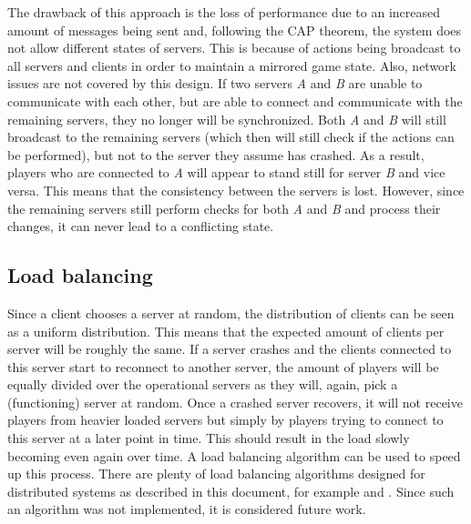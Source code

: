 		The drawback of this approach is the loss of performance due to an increased amount of messages being sent and, following the CAP theorem, the system does not allow different states of servers. 
		This is because of actions being broadcast to all servers and clients in order to maintain a mirrored game state. 
		Also, network issues are not covered by this design. 
		If two servers \emph{A} and \emph{B} are unable to communicate with each other, but are able to connect and communicate with the remaining servers, they no longer will be synchronized. 
		Both \emph{A} and \emph{B} will still broadcast to the remaining servers (which then will still check if the actions can be performed), but not to the server they assume has crashed. 
		As a result, players who are connected to \emph{A} will appear to stand still for server \emph{B} and vice versa. 
		This means that the consistency between the servers is lost. 
		However, since the remaining servers still perform checks for both \emph{A} and \emph{B} and process their changes, it can never lead to a conflicting state.
	
	\subsection{Load balancing}
	\label{subsec:load_balancing}
		Since a client chooses a server at random, the distribution of clients can be seen as a uniform distribution. 
		This means that the expected amount of clients per server will be roughly the same.
		If a server crashes and the clients connected to this server start to reconnect to another server, the amount of players will be equally divided over the operational servers as they will, again, pick a (functioning) server at random.
		Once a crashed server recovers, it will not receive players from heavier loaded servers but simply by players trying to connect to this server at a later point in time. 
		This should result in the load slowly becoming even again over time. 
		A load balancing algorithm can be used to speed up this process.
		There are plenty of load balancing algorithms designed for distributed systems as described in this document, for example \cite{wolff2001dynamic} and \cite{ballard2000client}. Since such an algorithm was not implemented, it is considered future work.
		
